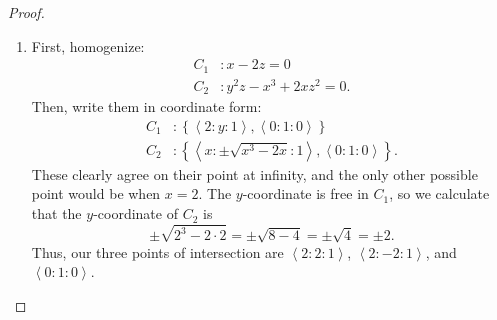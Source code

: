 \documentclass[12pt]{article}
\theoremstyle{definition}
\begin{document}
\begin{proof}
\begin{enumerate}[label=(\alph*)]
\begin{align*}
			      \sqrt{\frac{(\pm\sqrt{3}i+2)^2-5}{2}} & = \sqrt{\frac{\pm 4\sqrt{3}i - 4}{2}} \\
			                                            & = \sqrt{\pm 2\sqrt{3} i - 2}          \\
			                                            & = \sqrt{-3 \pm 2\sqrt{3} i + 1}       \\
			                                            & = \sqrt{(\pm\sqrt{3}i + 1)^2}         \\
			                                            & = \pm\sqrt{3}i + 1                    \\
			                                            & = (\pm\sqrt{3}i + 2) - 1.
		      \end{align*}
		      Thus, our two points of intersection are $\left\langle \pm\sqrt{3}i + 2 : \pm\sqrt{3}i + 1 : 1 \right\rangle$.
		\item First, homogenize: \begin{align*}
			      C_1 & : x - 2z = 0              \\
			      C_2 & : y^2z - x^3 + 2xz^2 = 0.
		      \end{align*}
		      Then, write them in coordinate form: \begin{align*}
			      C_1 & : \left\lbrace \left\langle 2 : y : 1 \right\rangle, \left\langle 0 : 1 : 0 \right\rangle \right\rbrace                 \\
			      C_2 & : \left\lbrace \left\langle x : \pm\sqrt{x^3-2x} : 1 \right\rangle, \left\langle 0 : 1 : 0 \right\rangle \right\rbrace.
		      \end{align*}
		      These clearly agree on their point at infinity, and the only other possible point would be when $x = 2$.
		      The $y$-coordinate is free in $C_1$, so we calculate that the $y$-coordinate of $C_2$ is \begin{equation*}
			      \pm\sqrt{2^3-2\cdot 2} = \pm\sqrt{8-4} = \pm\sqrt{4} = \pm 2.
		      \end{equation*}
		      Thus, our three points of intersection are $\left\langle 2 : 2 : 1 \right\rangle$, $\left\langle 2 : -2 : 1 \right\rangle$, and $\left\langle 0 : 1 : 0 \right\rangle$.
	\end{enumerate}
\end{proof}
\end{document}
